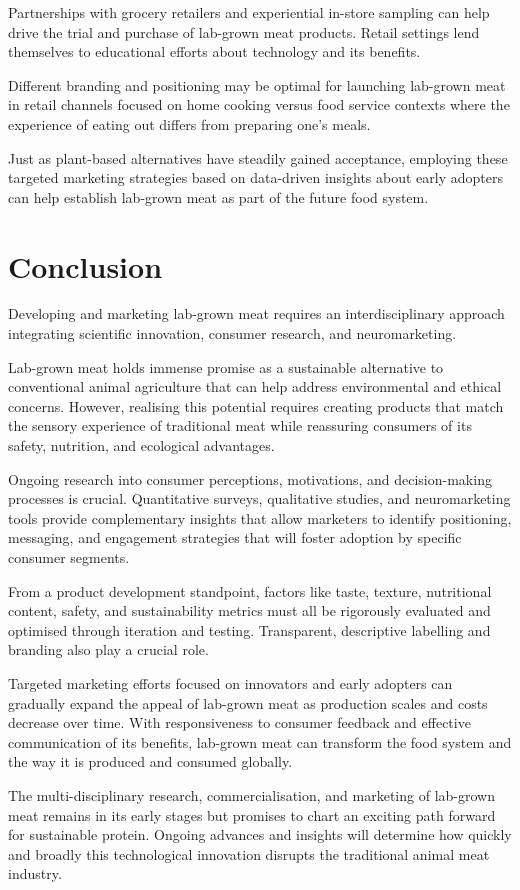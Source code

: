 \documentclass[10pt]{article}
\begin{document}
\begin{sloppypar}
  Partnerships with grocery retailers and experiential in-store sampling can help drive the trial and purchase of lab-grown meat products. Retail settings lend themselves to educational efforts about technology and its benefits.

  Different branding and positioning may be optimal for launching lab-grown meat in retail channels focused on home cooking versus food service contexts where the experience of eating out differs from preparing one’s meals.

  Just as plant-based alternatives have steadily gained acceptance, employing these targeted marketing strategies based on data-driven insights about early adopters can help establish lab-grown meat as part of the future food system.

  \section{Conclusion}
  \label{sec:conclusion}

  Developing and marketing lab-grown meat requires an interdisciplinary approach integrating scientific innovation, consumer research, and neuromarketing.

  Lab-grown meat holds immense promise as a sustainable alternative to conventional animal agriculture that can help address environmental and ethical concerns. However, realising this potential requires creating products that match the sensory experience of traditional meat while reassuring consumers of its safety, nutrition, and ecological advantages.

  Ongoing research into consumer perceptions, motivations, and decision-making processes is crucial. Quantitative surveys, qualitative studies, and neuromarketing tools provide complementary insights that allow marketers to identify positioning, messaging, and engagement strategies that will foster adoption by specific consumer segments.

  From a product development standpoint, factors like taste, texture, nutritional content, safety, and sustainability metrics must all be rigorously evaluated and optimised through iteration and testing. Transparent, descriptive labelling and branding also play a crucial role.

  Targeted marketing efforts focused on innovators and early adopters can gradually expand the appeal of lab-grown meat as production scales and costs decrease over time. With responsiveness to consumer feedback and effective communication of its benefits, lab-grown meat can transform the food system and the way it is produced and consumed globally.

  The multi-disciplinary research, commercialisation, and marketing of lab-grown meat remains in its early stages but promises to chart an exciting path forward for sustainable protein. Ongoing advances and insights will determine how quickly and broadly this technological innovation disrupts the traditional animal meat industry.

  \pagebreak
  \singlespacing %
  
  

\end{sloppypar}
\end{document}
